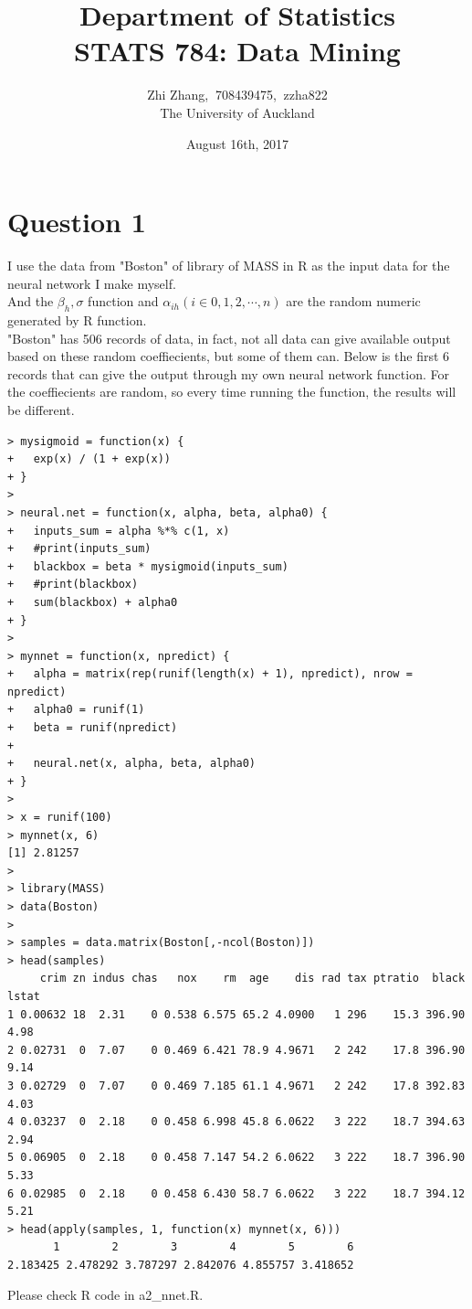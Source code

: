 \documentclass{article}%
\begin{document}
\title{Department of  Statistics \\ STATS 784: Data Mining}
\author{Zhi Zhang, $\ $708439475, $\ $zzha822
\\The University of Auckland}
\date{August 16th, 2017}
\maketitle


\section{Question 1}
I use the data from "Boston" of library of MASS in R as the input data for the neural network I make myself. \\
\indent And the $\beta_{h}, \sigma$ function and $\alpha_{ih} (i \in {0, 1, 2, \cdots, n})$ are the random numeric generated by R function.\\
\indent "Boston" has 506 records of data, in fact, not all data can give available output based on these random coeffiecients, but some of them can. Below is the first 6 records that can give the output through my own neural network function. For the coeffiecients are random, so every time running the function, the results will be different.
\begin{verbatim}
> mysigmoid = function(x) {
+   exp(x) / (1 + exp(x))
+ }
> 
> neural.net = function(x, alpha, beta, alpha0) {
+   inputs_sum = alpha %*% c(1, x)
+   #print(inputs_sum)
+   blackbox = beta * mysigmoid(inputs_sum)
+   #print(blackbox)
+   sum(blackbox) + alpha0
+ }
> 
> mynnet = function(x, npredict) {
+   alpha = matrix(rep(runif(length(x) + 1), npredict), nrow = npredict)
+   alpha0 = runif(1)
+   beta = runif(npredict)
+   
+   neural.net(x, alpha, beta, alpha0)
+ }
> 
> x = runif(100)
> mynnet(x, 6)
[1] 2.81257
> 
> library(MASS)
> data(Boston)
> 
> samples = data.matrix(Boston[,-ncol(Boston)])
> head(samples)
     crim zn indus chas   nox    rm  age    dis rad tax ptratio  black lstat
1 0.00632 18  2.31    0 0.538 6.575 65.2 4.0900   1 296    15.3 396.90  4.98
2 0.02731  0  7.07    0 0.469 6.421 78.9 4.9671   2 242    17.8 396.90  9.14
3 0.02729  0  7.07    0 0.469 7.185 61.1 4.9671   2 242    17.8 392.83  4.03
4 0.03237  0  2.18    0 0.458 6.998 45.8 6.0622   3 222    18.7 394.63  2.94
5 0.06905  0  2.18    0 0.458 7.147 54.2 6.0622   3 222    18.7 396.90  5.33
6 0.02985  0  2.18    0 0.458 6.430 58.7 6.0622   3 222    18.7 394.12  5.21
> head(apply(samples, 1, function(x) mynnet(x, 6)))
       1        2        3        4        5        6 
2.183425 2.478292 3.787297 2.842076 4.855757 3.418652
\end{verbatim}
Please check R code in a2\_nnet.R. 
\end{document}
